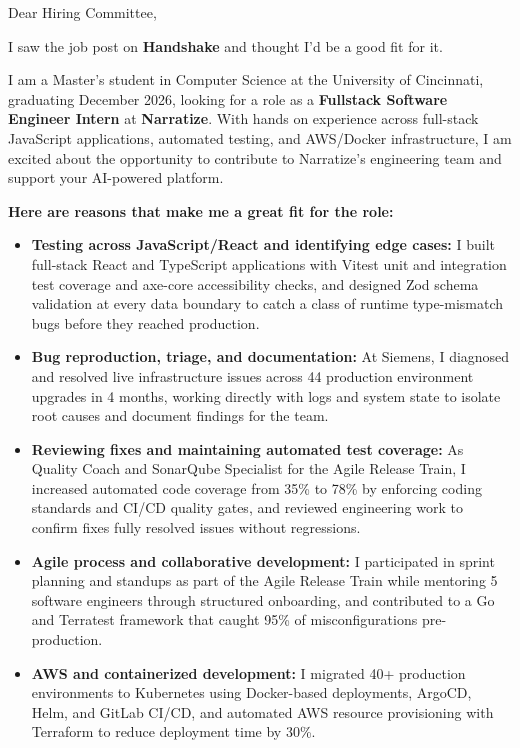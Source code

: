 \documentclass[11pt]{letter}
\date{}
\begin{document}
\begin{letter}{}

\opening{Dear Hiring Committee,}

I saw the job post on \textbf{Handshake} and thought I'd be a good fit for it.

I am a Master's student in Computer Science at the University of Cincinnati, graduating December 2026, looking for a role as a \textbf{Fullstack Software Engineer Intern} at \textbf{Narratize}. With hands on experience across full-stack JavaScript applications, automated testing, and AWS/Docker infrastructure, I am excited about the opportunity to contribute to Narratize's engineering team and support your AI-powered platform.

\textbf{Here are reasons that make me a great fit for the role:}

\begin{itemize}[leftmargin=*, itemsep=0.45em]
    \item \textbf{Testing across JavaScript/React and identifying edge cases:} I built full-stack React and TypeScript applications with Vitest unit and integration test coverage and axe-core accessibility checks, and designed Zod schema validation at every data boundary to catch a class of runtime type-mismatch bugs before they reached production.

    \item \textbf{Bug reproduction, triage, and documentation:} At Siemens, I diagnosed and resolved live infrastructure issues across 44 production environment upgrades in 4 months, working directly with logs and system state to isolate root causes and document findings for the team.

    \item \textbf{Reviewing fixes and maintaining automated test coverage:} As Quality Coach and SonarQube Specialist for the Agile Release Train, I increased automated code coverage from 35\% to 78\% by enforcing coding standards and CI/CD quality gates, and reviewed engineering work to confirm fixes fully resolved issues without regressions.

    \item \textbf{Agile process and collaborative development:} I participated in sprint planning and standups as part of the Agile Release Train while mentoring 5 software engineers through structured onboarding, and contributed to a Go and Terratest framework that caught 95\% of misconfigurations pre-production.

    \item \textbf{AWS and containerized development:} I migrated 40+ production environments to Kubernetes using Docker-based deployments, ArgoCD, Helm, and GitLab CI/CD, and automated AWS resource provisioning with Terraform to reduce deployment time by 30\%.
\end{itemize}


\end{letter}
\end{document}
